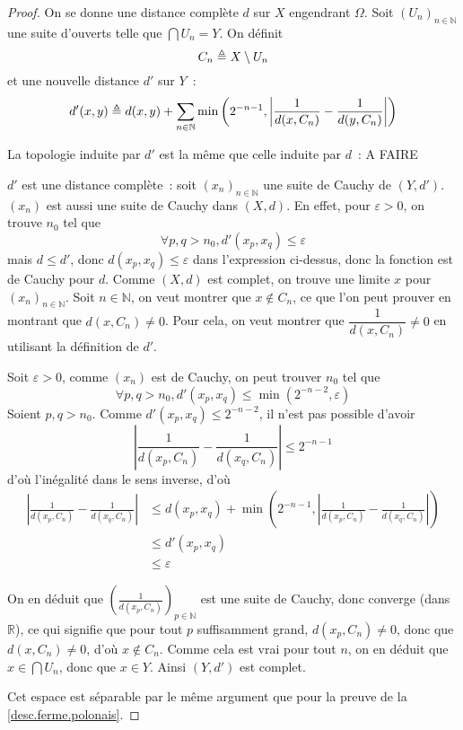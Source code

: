 \begin{proof}
  On se donne une distance complète $d$ sur $X$ engendrant $\Omega$. Soit
  $(U_n)_{n\in\mathbb N}$ une suite d'ouverts telle que $\bigcap U_n = Y$. On
  définit
  \[C_n \triangleq X\setminus U_n\]
  et une nouvelle distance $d'$ sur $Y$~:
  \[d'(x,y) \triangleq d(x,y) + \sum_{n\in \mathbb N} \min\left(2^{-n-1},
  \left|\frac{1}{d(x,C_n)} - \frac{1}{d(y,C_n)}\right|
  \right)\]

  La topologie induite par $d'$ est la même que celle induite par $d$~: A FAIRE

  $d'$ est une distance complète~: soit $(x_n)_{n\in\mathbb N}$ une suite de
  Cauchy de $(Y,d')$. $(x_n)$ est aussi une suite de Cauchy dans $(X,d)$. En
  effet, pour $\varepsilon > 0$, on trouve $n_0$ tel que
  \[\forall p,q > n_0, d'(x_p,x_q) \leq \varepsilon\]
  mais $d \leq d'$, donc $d(x_p,x_q) \leq \varepsilon$ dans l'expression
  ci-dessus, donc la fonction est de Cauchy pour $d$. Comme $(X,d)$ est complet,
  on trouve une limite $x$ pour $(x_n)_{n\in\mathbb N}$. Soit $n\in \mathbb N$, on
  veut montrer que $x\notin C_n$, ce que l'on peut prouver en montrant que
  $d(x,C_n) \neq 0$. Pour cela, on veut montrer que
  $\dfrac{1}{d(x,C_n)} \neq 0$ en utilisant la définition de $d'$.

  Soit $\varepsilon > 0$, comme $(x_n)$ est de Cauchy, on peut trouver $n_0$ tel
  que
  \[\forall p,q > n_0, d'(x_p,x_q) \leq \min(2^{-n-2}, \varepsilon)\]
  Soient $p,q > n_0$. Comme $d'(x_p,x_q) \leq 2^{-n-2}$, il n'est pas possible
  d'avoir
  \[\left|\frac{1}{d(x_p,C_n)}-\frac{1}{d(x_q,C_n)}\right| \leq 2^{-n-1}\]
  d'où l'inégalité dans le sens inverse, d'où
  \begin{align*}
    \left|\frac{1}{d(x_p,C_n)} - \frac{1}{d(x_q,C_n)}\right| & \leq
    d(x_p,x_q) + \min\left(2^{-n-1},\left|\frac{1}{d(x_p,C_n)}
    - \frac{1}{d(x_q,C_n)}\right|\right)\\
    &\leq d'(x_p,x_q)\\
    &\leq \varepsilon
  \end{align*}

  On en déduit que
  $\displaystyle\left(\frac{1}{d(x_p,C_n)}\right)_{p\in\mathbb N}$ est une
  suite de Cauchy, donc converge (dans $\mathbb R$), ce qui signifie que
  pour tout $p$ suffisamment grand, $d(x_p,C_n) \neq 0$, donc que
  $d(x,C_n) \neq 0$, d'où $x\notin C_n$. Comme cela est vrai pour tout $n$, on
  en déduit que $x\in \bigcap U_n$, donc que $x\in Y$. Ainsi $(Y,d')$ est
  complet.

  Cet espace est séparable par le même argument que pour la preuve de la
  \cref{desc.ferme.polonais}.
\end{proof}

